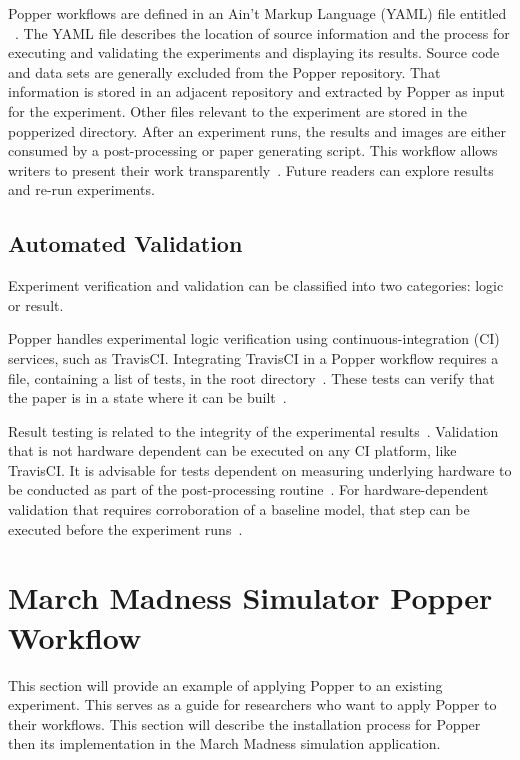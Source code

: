 \documentclass{IEEEtran}
\begin{document}
Popper workflows are defined in an Ain't Markup Language (YAML) file entitled ~\cite{popperWeb}. The YAML file describes the location of source information and the process for executing and validating the experiments and displaying its results. Source code and data sets are generally excluded from the Popper repository. That information is stored in an adjacent repository and extracted by Popper as input for the experiment. Other files relevant to the experiment are stored in the popperized directory. After an experiment runs, the results and images are either consumed by a post-processing or paper generating script. This workflow allows writers to present their work transparently~\cite{TPC}. Future readers can explore results and re-run experiments.

\subsection{Automated Validation}
Experiment verification and validation can be classified into two categories: logic or result. 

Popper handles experimental logic verification using continuous-integration (CI) services, such as TravisCI. Integrating TravisCI in a Popper workflow requires a  file, containing a list of tests, in the root directory~\cite{TPC}. These tests can verify that the paper is in a state where it can be built~\cite{TPC}.

Result testing is related to the integrity of the experimental results~\cite{TPC}. Validation that is not hardware dependent can be executed on any CI platform, like TravisCI. It is advisable for tests dependent on measuring underlying hardware to be conducted as part of the post-processing routine~\cite{TPC}. For hardware-dependent validation that requires corroboration of a baseline model, that step can be executed before the experiment runs~\cite{TPC}. 

\section{March Madness Simulator Popper Workflow}

This section will provide an example of applying Popper to an existing experiment. This serves as a guide for researchers who want to apply Popper to their workflows. This section will describe the installation process for Popper then its implementation in the March Madness simulation application.  
\end{document}
